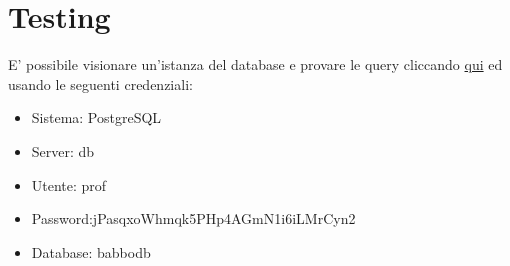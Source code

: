 \documentclass[12pt]{report}
\begin{document}
\chapter{Testing}
E' possibile visionare un'istanza del database e provare le query cliccando
\href{http://130.136.3.15}{qui} ed usando le seguenti credenziali:
\begin{itemize}
    \item Sistema: PostgreSQL
    \item Server: db
    \item Utente: prof
    \item Password:jPasqxoWhmqk5PHp4AGmN1i6iLMrCyn2
    \item Database: babbodb
\end{itemize}
\end{document}
